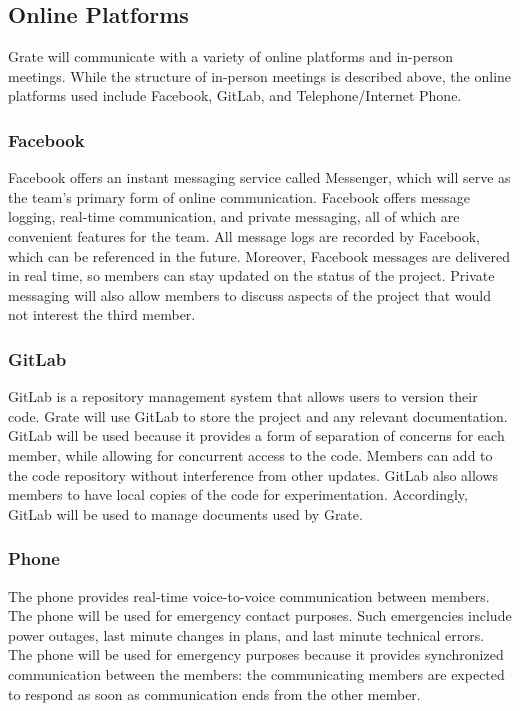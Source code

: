 \documentclass{article}
\begin{document}
\subsection{Online Platforms}
Grate will communicate with a variety of online platforms and in-person 
meetings. While the structure of in-person meetings is described above, the 
online platforms used include Facebook, GitLab, and Telephone/Internet Phone.

\subsubsection{Facebook}
Facebook offers an instant messaging service called Messenger, which will serve 
as the team's primary form of online communication. Facebook offers message 
logging, real-time communication, and private messaging, all of which are 
convenient features for the team. All message logs are recorded by Facebook, 
which can be referenced in the future. Moreover, Facebook messages are delivered 
in real time, so members can stay updated on the status of the project. Private 
messaging will also allow members to discuss aspects of the project that would 
not interest the third member.

\subsubsection{GitLab}
GitLab is a repository management system that allows users to version their 
code. Grate will use GitLab to store the project and any relevant 
documentation. GitLab will be used because it provides a form of separation of 
concerns for each member, while allowing for concurrent access to the code. 
Members can add to the code repository without interference from other updates. 
GitLab also allows members to have local copies of the code for experimentation. 
Accordingly, GitLab will be used to manage documents used by Grate.

\subsubsection{Phone}
The phone provides real-time voice-to-voice communication between members. The 
phone will be used for emergency contact purposes. Such emergencies include 
power outages, last minute changes in plans, and last minute technical errors. 
The phone will be used for emergency purposes because it provides synchronized 
communication between the members: the communicating members are expected to 
respond as soon as communication ends from the other member.
\end{document}
